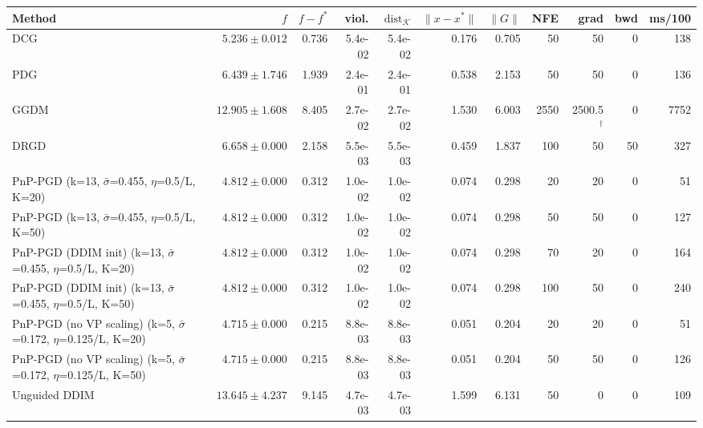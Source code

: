 \begin{tabular}{lrrrrrrrrrr}
\toprule
Method & $f$ & $f-f^*$ & viol. & $\mathrm{dist}_\mathcal{K}$ & $\|x-x^*\|$ & $\|G\|$ & NFE & grad & bwd & ms/100 \\
\midrule
DCG & $5.236\pm0.012$ & 0.736 & 5.4e-02 & 5.4e-02 & 0.176 & 0.705 & 50 & 50 & 0 & 138 \\
PDG & $6.439\pm1.746$ & 1.939 & 2.4e-01 & 2.4e-01 & 0.538 & 2.153 & 50 & 50 & 0 & 136 \\
GGDM & $12.905\pm1.608$ & 8.405 & 2.7e-02 & 2.7e-02 & 1.530 & 6.003 & 2550 & 2500.5$^\dagger$ & 0 & 7752 \\
DRGD & $6.658\pm0.000$ & 2.158 & 5.5e-03 & 5.5e-03 & 0.459 & 1.837 & 100 & 50 & 50 & 327 \\
PnP-PGD (k=13, $\bar\sigma$=0.455, $\eta$=0.5/L, K=20) & $4.812\pm0.000$ & 0.312 & 1.0e-02 & 1.0e-02 & 0.074 & 0.298 & 20 & 20 & 0 & 51 \\
PnP-PGD (k=13, $\bar\sigma$=0.455, $\eta$=0.5/L, K=50) & $4.812\pm0.000$ & 0.312 & 1.0e-02 & 1.0e-02 & 0.074 & 0.298 & 50 & 50 & 0 & 127 \\
PnP-PGD (DDIM init) (k=13, $\bar\sigma$=0.455, $\eta$=0.5/L, K=20) & $4.812\pm0.000$ & 0.312 & 1.0e-02 & 1.0e-02 & 0.074 & 0.298 & 70 & 20 & 0 & 164 \\
PnP-PGD (DDIM init) (k=13, $\bar\sigma$=0.455, $\eta$=0.5/L, K=50) & $4.812\pm0.000$ & 0.312 & 1.0e-02 & 1.0e-02 & 0.074 & 0.298 & 100 & 50 & 0 & 240 \\
PnP-PGD (no VP scaling) (k=5, $\bar\sigma$=0.172, $\eta$=0.125/L, K=20) & $4.715\pm0.000$ & 0.215 & 8.8e-03 & 8.8e-03 & 0.051 & 0.204 & 20 & 20 & 0 & 51 \\
PnP-PGD (no VP scaling) (k=5, $\bar\sigma$=0.172, $\eta$=0.125/L, K=50) & $4.715\pm0.000$ & 0.215 & 8.8e-03 & 8.8e-03 & 0.051 & 0.204 & 50 & 50 & 0 & 126 \\
Unguided DDIM & $13.645\pm4.237$ & 9.145 & 4.7e-03 & 4.7e-03 & 1.599 & 6.131 & 50 & 0 & 0 & 109 \\
\bottomrule
\end{tabular}
\par{}

